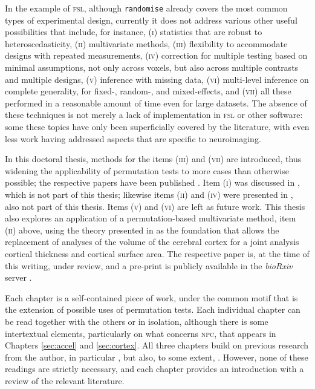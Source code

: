 In the example of \textsc{fsl}, although \texttt{randomise} already covers the most common types of experimental design, currently it does not address various other useful possibilities that include, for instance, (\textsc{i}) statistics that are robust to heteroscedasticity, (\textsc{ii}) multivariate methods, (\textsc{iii}) flexibility to accommodate designs with repeated measurements, (\textsc{iv}) correction for multiple testing based on minimal assumptions, not only across voxels, but also across multiple contrasts and multiple designs, (\textsc{v}) inference with missing data, (\textsc{vi}) multi-level inference on complete generality, for fixed-, random-, and mixed-effects, and (\textsc{vii}) all these performed in a reasonable amount of time even for large datasets. The absence of these techniques is not merely a lack of implementation in \textsc{fsl} or other software: some these topics have only been superficially covered by the literature, with even less work having addressed aspects that are specific to neuroimaging.

In this doctoral thesis, methods for the items (\textsc{iii}) and (\textsc{vii}) are introduced, thus widening the applicability of permutation tests to more cases than otherwise possible; the respective papers have been published \citep{Winkler2015, Winkler2016_fast}. Item (\textsc{i}) was discussed in \citet{Winkler2014}, which is not part of this thesis; likewise items (\textsc{ii}) and (\textsc{iv}) were presented in \citet{Winkler2016_npc}, also not part of this thesis. Items (\textsc{v}) and (\textsc{vi}) are left as future work. This thesis also explores an application of a permutation-based multivariate method, item (\textsc{ii}) above, using the theory presented in \citep{Winkler2016_npc} as the foundation that allows the replacement of analyses of the volume of the cerebral cortex for a joint analysis cortical thickness and cortical surface area. The respective paper is, at the time of this writing, under review, and a pre-print is publicly available in the \emph{bioRxiv} server \citep{Winkler2016_joint}.

Each chapter is a self-contained piece of work, under the common motif that is the extension of possible uses of permutation tests. Each individual chapter can be read together with the others or in isolation, although there is some intertextual elements, particularly on what concerns \textsc{npc}, that appears in Chapters \ref{sec:accel} and \ref{sec:cortex}. All three chapters build on previous research from the author, in particular \citet{Winkler2014, Winkler2016_npc}, but also, to some extent, \citet{Winkler2010, Winkler2012}. However, none of these readings are strictly necessary, and each chapter provides an introduction with a review of the relevant literature.

